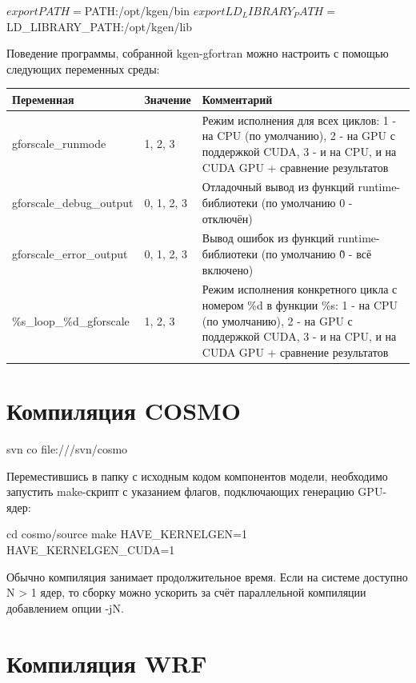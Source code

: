 \documentclass[a4,12pt]{report}
\begin{document}
\begin{code}
$ export PATH=$PATH:/opt/kgen/bin
$ export LD_LIBRARY_PATH=$LD_LIBRARY_PATH:/opt/kgen/lib
\end{code}

Поведение программы, собранной kgen-gfortran можно настроить с помощью следующих переменных среды:

\vspace{15pt}
\begin{tabular}[h]{|l|l|p{7cm}|}
\hline
Переменная & Значение & Комментарий \\ \hline \hline
gforscale\_runmode & 1, 2, 3 & Режим исполнения для всех циклов: 1 - на CPU (по умолчанию), 2 - на GPU с поддержкой CUDA, 3 - и на CPU, и на CUDA GPU + сравнение результатов \\ \hline
gforscale\_debug\_output & 0, 1, 2, 3 & Отладочный вывод из функций runtime-библиотеки (по умолчанию 0 - отключён) \\ \hline
gforscale\_error\_output & 0, 1, 2, 3 & Вывод ошибок из функций runtime-библиотеки (по умолчанию \~0 - всё включено) \\ \hline
\%s\_loop\_\%d\_gforscale & 1, 2, 3 & Режим исполнения конкретного цикла с номером \%d в функции \%s: 1 - на CPU (по умолчанию), 2 - на GPU с поддержкой CUDA, 3 - и на CPU, и на CUDA GPU + сравнение результатов \\ \hline
\end{tabular}

\section{Компиляция COSMO}

\begin{code}
svn co file:///svn/cosmo
\end{code}

Переместившись в папку с исходным кодом компонентов модели, необходимо запустить make-скрипт с указанием флагов, подключающих генерацию GPU-ядер:

\begin{code}
cd cosmo/source
make HAVE_KERNELGEN=1 HAVE_KERNELGEN_CUDA=1
\end{code}

Обычно компиляция занимает продолжительное время. Если на системе доступно N > 1 ядер, то сборку можно ускорить за счёт параллельной компиляции добавлением опции -jN.

\section{Компиляция WRF}
\end{document}
